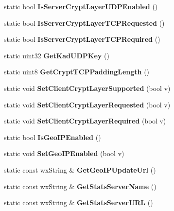 \begin{DoxyCompactItemize}
\item 
static bool {\bfseries IsServerCryptLayerUDPEnabled} ()\label{classCPreferences_ace2592f692aaed84cd24298c9c7ad278}

\item 
static bool {\bfseries IsServerCryptLayerTCPRequested} ()\label{classCPreferences_af32759498f8a9cfc2e87f6e47b4919e1}

\item 
static bool {\bfseries IsServerCryptLayerTCPRequired} ()\label{classCPreferences_aaaf7b43f07c3b7c0b39ce4035bb4c9a3}

\item 
static uint32 {\bfseries GetKadUDPKey} ()\label{classCPreferences_a9393813c6bce3c924d4bb0bd7078cdc8}

\item 
static uint8 {\bfseries GetCryptTCPPaddingLength} ()\label{classCPreferences_a6c341efc0e8b02022f028a82269174ae}

\item 
static void {\bfseries SetClientCryptLayerSupported} (bool v)\label{classCPreferences_a86482ff603a0d0b098eaf9b45d4abb39}

\item 
static void {\bfseries SetClientCryptLayerRequested} (bool v)\label{classCPreferences_ac11d3ba3a8009f450910348a67e49ebe}

\item 
static void {\bfseries SetClientCryptLayerRequired} (bool v)\label{classCPreferences_abe023981e15b1860487db1d225d90663}

\item 
static bool {\bfseries IsGeoIPEnabled} ()\label{classCPreferences_ae46cfd4af51e2ba1bd6c1f855b6c330a}

\item 
static void {\bfseries SetGeoIPEnabled} (bool v)\label{classCPreferences_a728d064f6e526c218b0538b12c3514c1}

\item 
static const wxString \& {\bfseries GetGeoIPUpdateUrl} ()\label{classCPreferences_afa31dfe98b442046cb980c43b77e8769}

\item 
static const wxString \& {\bfseries GetStatsServerName} ()\label{classCPreferences_a20cb08bf66ce39e37c641481043200bd}

\item 
static const wxString \& {\bfseries GetStatsServerURL} ()\label{classCPreferences_aff1a9ce6b7800e09aeb3f6aa94edee16}


\end{DoxyCompactItemize}
